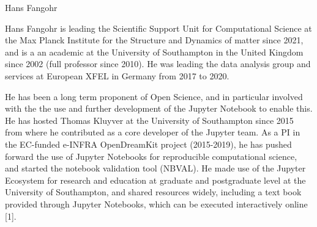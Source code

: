 \begin{participant}[type=leadPI,PM=5,gender=male]{Hans Fangohr}







  \medskip Hans Fangohr is leading the Scientific Support Unit for Computational
  Science at the Max Planck Institute for the Structure and Dynamics of matter
  since 2021, and is a an academic at the University of Southampton in the United Kingdom
  since 2002 (full professor since 2010). He was leading the data analysis group
  and services at European XFEL in Germany from 2017 to 2020.

  He has been a long term proponent of Open Science, and in particular
  involved with the the use and further development of the Jupyter
  Notebook to enable this. He has hosted Thomas Kluyver at the
  University of Southampton since 2015 from where he contributed as a
  core developer of the Jupyter team. As a PI in the EC-funded e-INFRA
  OpenDreamKit project (2015-2019), he has pushed forward the use of
  Jupyter Notebooks for reproducible computational science, and
  started the notebook validation tool (NBVAL). He made use of the
  Jupyter Ecosystem for research and education at graduate and
  postgraduate level at the University of Southampton, and shared
  resources widely, including a text book provided through Jupyter
  Notebooks, which can be executed interactively online [1].


\end{participant}
